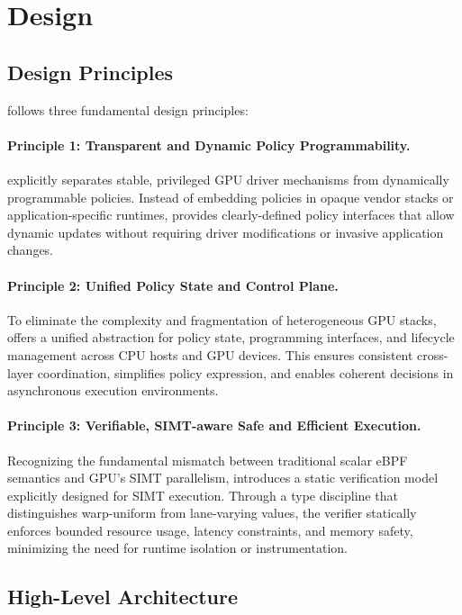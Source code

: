 \section{\sys Design}

\subsection{Design Principles}

\sys follows three fundamental design principles:

\paragraph{Principle 1: Transparent and Dynamic Policy Programmability.}
\sys explicitly separates stable, privileged GPU driver mechanisms from dynamically programmable policies. Instead of embedding policies in opaque vendor stacks or application-specific runtimes, \sys provides clearly-defined policy interfaces that allow dynamic updates without requiring driver modifications or invasive application changes.

\paragraph{Principle 2: Unified Policy State and Control Plane.}
To eliminate the complexity and fragmentation of heterogeneous GPU stacks, \sys offers a unified abstraction for policy state, programming interfaces, and lifecycle management across CPU hosts and GPU devices. This ensures consistent cross-layer coordination, simplifies policy expression, and enables coherent decisions in asynchronous execution environments.

\paragraph{Principle 3: Verifiable, SIMT-aware Safe and Efficient Execution.}
Recognizing the fundamental mismatch between traditional scalar eBPF semantics and GPU's SIMT parallelism, \sys introduces a static verification model explicitly designed for SIMT execution. Through a type discipline that distinguishes warp-uniform from lane-varying values, the verifier statically enforces bounded resource usage, latency constraints, and memory safety, minimizing the need for runtime isolation or instrumentation.

\subsection{High-Level Architecture}
\label{sec:arch}

